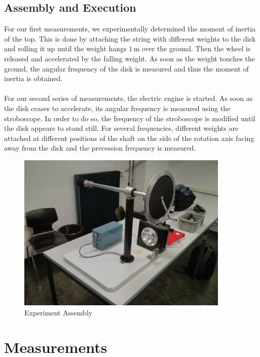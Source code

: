 \documentclass{scrreprt}
\newcommand{\unit}[1]{\ensuremath{\, \mathrm{#1}}}
\begin{document}
\subsection{Assembly and Execution}
For our first measurements, we experimentally determined the moment of inertia of the top. This is done by attaching the string with different weights to the disk and rolling it up until the weight hangs $1 \unit{m}$ over the ground. Then the wheel is released and accelerated by the falling weight. As soon as the weight touches the ground, the angular frequency of the disk is measured and thus the moment of inertia is obtained.\\\\
For our second series of measurements, the electric engine is started. As soon as the disk ceases to accelerate, its angular frequency is measured using the stroboscope. In order to do so, the frequency of the stroboscope is modified until the disk appears to stand still. For several frequencies, different weights are attached at different positions of the shaft on the side of the rotation axis facing away from the disk and the precession frequency is measured.

\begin{figure}[H]
	\centering
  \includegraphics[width=0.9\textwidth]{img/assembly.jpg}
	\caption{Experiment Assembly}
	\label{fig:assembly}
\end{figure}


\section{Measurements}
\end{document}
